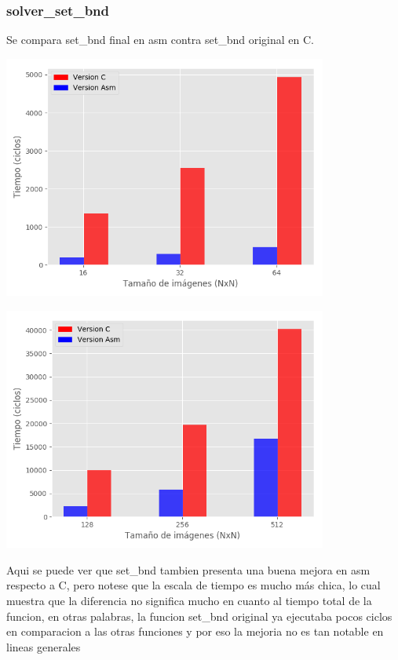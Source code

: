 \subsubsection{solver_set\_bnd}
Se compara set_bnd final en asm contra set_bnd original en C.

\begin{center}
\includegraphics[width=0.8\textwidth]{imagenes/solver-set-bnd16-64.png}
\end{center}

\begin{center}
\includegraphics[width=0.8\textwidth]{imagenes/solver-set-bnd128-512.png}
\end{center}

Aqui se puede ver que set_bnd tambien presenta una buena mejora en asm respecto a C, pero notese que la escala
de tiempo es mucho más chica, lo cual muestra que la diferencia no significa mucho en cuanto al tiempo
total de la funcion, en otras palabras, la funcion set_bnd original ya ejecutaba pocos ciclos
en comparacion a las otras funciones y por eso la mejoria no es tan notable en lineas generales

